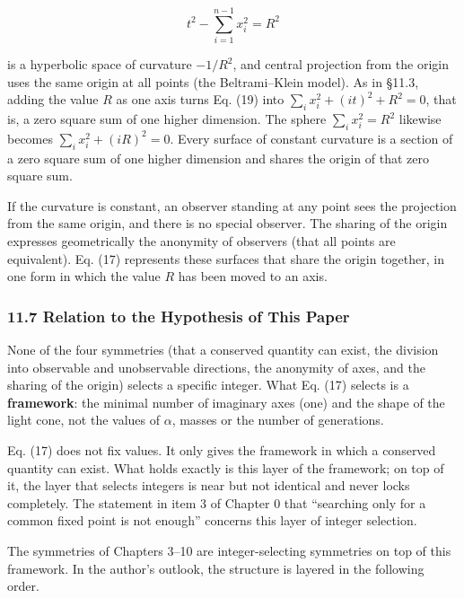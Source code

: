 \documentclass[
  a4paper,
]{article}
\begin{document}
\[
t^2-\sum_{i=1}^{n-1}x_i^2=R^2
\tag{19}
\]

is a hyperbolic space of curvature \(-1/R^2\), and central projection
from the origin uses the same origin at all points (the Beltrami--Klein
model). As in §11.3, adding the value \(R\) as one axis turns Eq. (19)
into \(\sum_i x_i^2+(it)^2+R^2=0\), that is, a zero square sum of one
higher dimension. The sphere \(\sum_i x_i^2=R^2\) likewise becomes
\(\sum_i x_i^2+(iR)^2=0\). Every surface of constant curvature is a
section of a zero square sum of one higher dimension and shares the
origin of that zero square sum.

If the curvature is constant, an observer standing at any point sees the
projection from the same origin, and there is no special observer. The
sharing of the origin expresses geometrically the anonymity of observers
(that all points are equivalent). Eq. (17) represents these surfaces
that share the origin together, in one form in which the value \(R\) has
been moved to an axis.

\subsubsection{11.7 Relation to the Hypothesis of This
Paper}\label{relation-to-the-hypothesis-of-this-paper}

None of the four symmetries (that a conserved quantity can exist, the
division into observable and unobservable directions, the anonymity of
axes, and the sharing of the origin) selects a specific integer. What
Eq. (17) selects is a \textbf{framework}: the minimal number of
imaginary axes (one) and the shape of the light cone, not the values of
\(\alpha\), masses or the number of generations.

Eq. (17) does not fix values. It only gives the framework in which a
conserved quantity can exist. What holds exactly is this layer of the
framework; on top of it, the layer that selects integers is near but not
identical and never locks completely. The statement in item 3 of Chapter
0 that ``searching only for a common fixed point is not enough''
concerns this layer of integer selection.

The symmetries of Chapters 3--10 are integer-selecting symmetries on top
of this framework. In the author's outlook, the structure is layered in
the following order.
\end{document}
